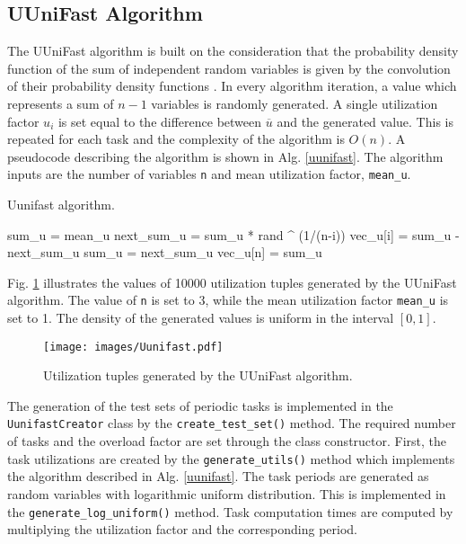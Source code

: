 \subsection{UUniFast Algorithm}
The UUniFast algorithm is built on the consideration that the probability density function of the sum of independent random variables is given by the convolution of their probability density functions \cite{bini2005measuring}.
In every algorithm iteration, a value which represents a sum of $n-1$ variables is randomly generated.
A single utilization factor $u_i$ is set equal to the difference between $\overline{u}$ and the generated value.
This is repeated for each task and the complexity of the algorithm is $O(n)$.
A pseudocode describing the algorithm is shown in Alg. \ref{uunifast}.
The algorithm inputs are the number of variables \texttt{n} and mean utilization factor, \texttt{mean\_u}.
\begin{algorithm}
\caption{Uunifast algorithm.\label{uunifast}}
\begin{algorithmic}[1]
\State sum\_u = mean\_u
\State next\_sum\_u = sum\_u * rand \^{} (1/(n-i))
\State vec\_u[i] = sum\_u - next\_sum\_u
\State sum\_u = next\_sum\_u
\EndFor
\State vec\_u[n] = sum\_u
\end{algorithmic}
\end{algorithm}
Fig. \ref{uunifast:fig} illustrates the values of 10000 utilization tuples generated by the UUniFast algorithm.
The value of \texttt{n} is set to 3, while the mean utilization factor \texttt{mean\_u} is set to 1.
The density of the generated values is uniform in the interval $[0, 1]$.
\begin{figure}[ht]
    \centering
    \texttt{[image: images/Uunifast.pdf]}
    \caption{Utilization tuples generated by the UUniFast algorithm.}
    \label{uunifast:fig}
\end{figure}

The generation of the test sets of periodic tasks is implemented in the 
\\\texttt{UunifastCreator} class by the \texttt{create\_test\_set()} method.
The required number of tasks and the overload factor are set through the class constructor.
First, the task utilizations are created by the \texttt{generate\_utils()} method which implements the algorithm described in Alg. \ref{uunifast}.
The task periods are generated as random variables with logarithmic uniform distribution.
This is implemented in the \texttt{generate\_log\_uniform()} method.
Task computation times are computed by multiplying the utilization factor and the corresponding period.

